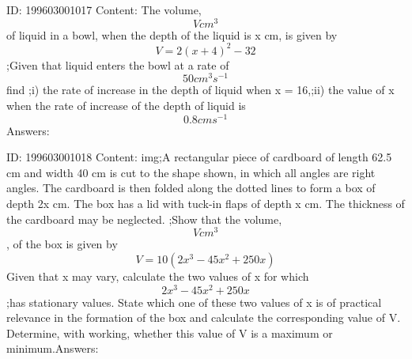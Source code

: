 \documentclass{article}
\begin{document}
ID: 199603001017
Content:
The volume, \[Vcm^3\] of liquid in a bowl, when the depth of the liquid is x cm, is given by \[V=2(x+4)^2-32\];Given that liquid enters the bowl at a rate of \[50cm^3s^{-1}\] find ;i) the rate of increase in the depth of liquid when x = 16,;ii) the value of x when the rate of increase of the depth of liquid is \[0.8cms^{-1}\]Answers:

ID: 199603001018
Content:
img;A rectangular piece of cardboard of length 62.5 cm and width 40 cm is cut to the shape shown, in which all angles are right angles. The cardboard is then folded along the dotted lines to form a box of depth 2x cm. The box has a lid with tuck-in flaps of depth x cm. The thickness of the cardboard may be neglected. ;Show that the volume, \[Vcm^3\], of the box is given by \[V = 10(2x^3-45x^2+250x)\] Given that x may vary, calculate the two values of x for which \[2x^3-45x^2+250x\];has stationary values. State which one of these two values of x is of practical relevance in the formation of the box and calculate the corresponding value of V. Determine, with working, whether this value of V is a maximum or minimum.Answers:
\end{document}
